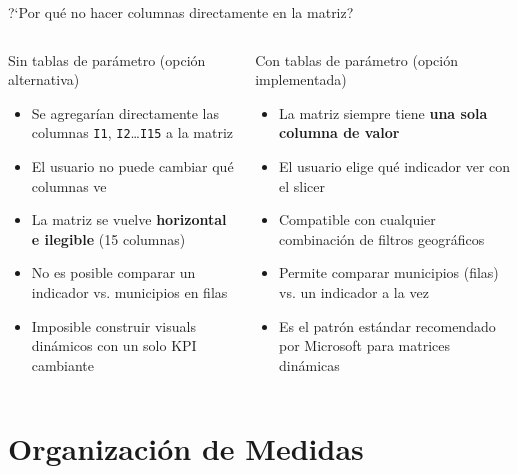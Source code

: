 \documentclass[aspectratio=169, 10pt]{beamer}
\newcommand{\yes}{\textcolor{green!60!black}{\faCheck}}
\begin{document}
\begin{frame}{?`Por qu\'e no hacer columnas directamente en la matriz?}

\begin{columns}
\begin{exampleblock}{Sin tablas de par\'ametro (opci\'on alternativa)}
\begin{itemize}\footnotesize
  \item Se agregar\'ian directamente las columnas \texttt{I1}, \texttt{I2}\ldots \texttt{I15} a la matriz
  \item El usuario no puede cambiar qu\'e columnas ve
  \item La matriz se vuelve \textbf{horizontal e ilegible} (15 columnas)
  \item No es posible comparar un indicador vs. municipios en filas
  \item Imposible construir visuals din\'amicos con un solo KPI cambiante
\end{itemize}
\end{exampleblock}

\begin{alertblock}{Con tablas de par\'ametro (opci\'on implementada)}
\begin{itemize}\footnotesize
  \item[\yes] La matriz siempre tiene \textbf{una sola columna de valor}
  \item[\yes] El usuario elige qu\'e indicador ver con el slicer
  \item[\yes] Compatible con cualquier combinaci\'on de filtros geogr\'aficos
  \item[\yes] Permite comparar municipios (filas) vs. un indicador a la vez
  \item[\yes] Es el patr\'on est\'andar recomendado por Microsoft para matrices din\'amicas
\end{itemize}
\end{alertblock}
\end{columns}
\end{frame}

\section{Organizaci\'on de Medidas}
\end{document}
